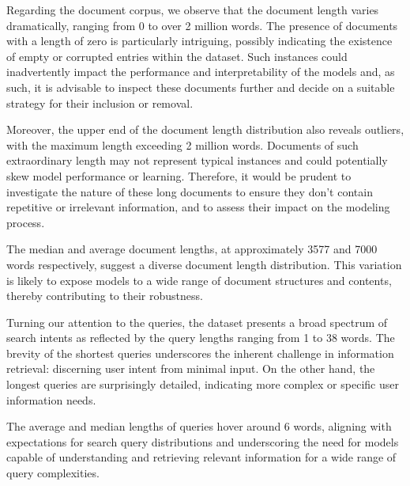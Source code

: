 \documentclass[11pt,a4paper]{article}
\begin{document}
Regarding the document corpus, we observe that the document length
varies dramatically, ranging from 0 to over 2 million words. The
presence of documents with a length of zero is particularly
intriguing, possibly indicating the existence of empty or corrupted
entries within the dataset. Such instances could inadvertently impact
the performance and interpretability of the models and, as such, it
is advisable to inspect these documents further and decide on a
suitable strategy for their inclusion or removal.

Moreover, the upper end of the document length distribution also
reveals outliers, with the maximum length exceeding 2 million words.
Documents of such extraordinary length may not represent typical
instances and could potentially skew model performance or learning.
Therefore, it would be prudent to investigate the nature of these
long documents to ensure they don't contain repetitive or irrelevant
information, and to assess their impact on the modeling process.

The median and average document lengths, at approximately 3577 and
7000 words respectively, suggest a diverse document length
distribution. This variation is likely to expose models to a wide
range of document structures and contents, thereby contributing to
their robustness.

Turning our attention to the queries, the dataset presents a broad
spectrum of search intents as reflected by the query lengths ranging
from 1 to 38 words. The brevity of the shortest queries underscores
the inherent challenge in information retrieval: discerning user
intent from minimal input. On the other hand, the longest queries are
surprisingly detailed, indicating more complex or specific user
information needs.

The average and median lengths of queries hover around 6 words,
aligning with expectations for search query distributions and
underscoring the need for models capable of understanding and
retrieving relevant information for a wide range of query
complexities.
\end{document}
